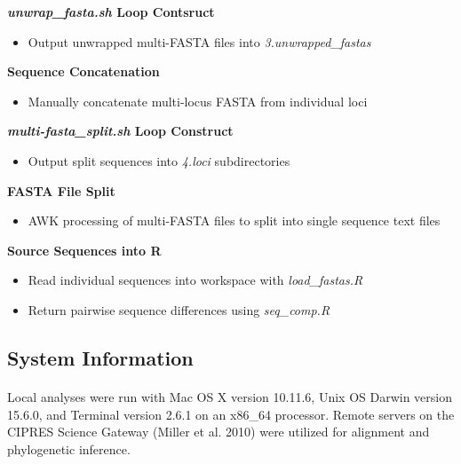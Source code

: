 \begin{seqlist}
\item{\textbf{\textit{unwrap\_fasta.sh} Loop Contsruct}}
\begin{itemize}
\item{Output unwrapped multi-FASTA files into \textit{3.unwrapped\_fastas}}
\end{itemize}

\item{\textbf{Sequence Concatenation}}
\begin{itemize}
\item{Manually concatenate multi-locus FASTA from individual loci}
\end{itemize}

\clearpage

\item{\textbf{\textit{multi-fasta\_split.sh} Loop Construct}}
\begin{itemize}
\item{Output split sequences into \textit{4.loci} subdirectories}
\end{itemize}

\item{\textbf{FASTA File Split}}
\begin{itemize}
\item{AWK processing of multi-FASTA files to split into single sequence text files}
\end{itemize}

\item{\textbf{Source Sequences into R}}
\begin{itemize}
\item{Read individual sequences into workspace with \textit{load\_fastas.R}}
\item{Return pairwise sequence differences using \textit{seq\_comp.R}}
\end{itemize}

\end{seqlist}

\subsection*{System Information}

\paragraph{} Local analyses were run with Mac OS X version 10.11.6, Unix OS Darwin version 15.6.0, and Terminal version 2.6.1 on an x86\_64 processor.  Remote servers on the CIPRES Science Gateway (Miller et al. 2010) were utilized for alignment and phylogenetic inference.  

